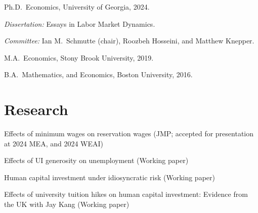 \documentclass[letterpaper]{article}
\renewenvironment{itemize}{
  \begin{list}{}{
    \setlength{\leftmargin}{1.5em}
  }
}{
  \end{list}
}
\begin{document}
\begin{itemize}
  \item Ph.D.\ Economics, University of Georgia, 2024.
     \begin{itemize}
    	 \item \textit{Dissertation:}
       	Essays in Labor Market Dynamics.

    	 \item \textit{Committee:}
       	Ian M.\ Schmutte (chair),
       	Roozbeh Hosseini, and Matthew Knepper.

     \end{itemize}


	 \item M.A.\ Economics, Stony Brook University, 2019.

    \item B.A.\ Mathematics, and Economics, Boston University, 2016.
		
\end{itemize}

\section*{Research}
\begin{itemize}
  \item{Effects of minimum wages on reservation wages}{}{ (JMP; accepted for presentation at 2024 MEA, and 2024 WEAI) }
  \item{Effects of UI generosity on unemployment}{}{ (Working paper)}
  \item{Human capital investment under idiosyncratic risk}{}{ (Working paper)}
  \item{Effects of university tuition hikes on human capital investment: Evidence from the UK}{ with Jay Kang}{ (Working paper)}
\end{itemize}
\end{document}
